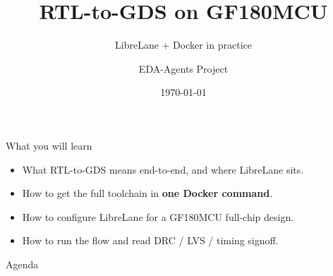 \documentclass[aspectratio=169,11pt]{beamer}
\title{RTL-to-GDS on GF180MCU}
\subtitle{LibreLane + Docker in practice}
\author{EDA-Agents Project}
\institute{Open-Source IC Design}
\date{\today}
\begin{document}
\begin{frame}[plain]
  \titlepage
\end{frame}

\begin{frame}{What you will learn}
  \begin{itemize}
    \item What RTL-to-GDS means end-to-end, and where LibreLane sits.
    \item How to get the full toolchain in \textbf{one Docker command}.
    \item How to configure LibreLane for a GF180MCU full-chip design.
    \item How to run the flow and read DRC / LVS / timing signoff.
  \end{itemize}
\end{frame}

\begin{frame}{Agenda}
  \tableofcontents
\end{frame}







\end{document}
